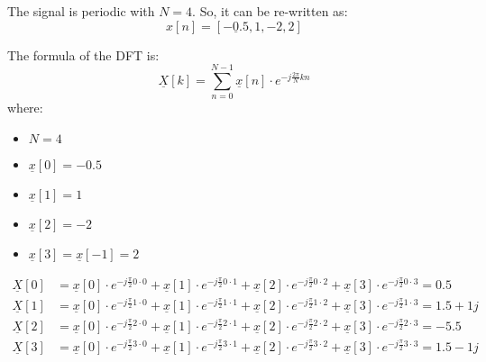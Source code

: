 \begin{solution}
	The signal is periodic with $N = 4$. So, it can be re-written as:
	\begin{equation*}
		x[n] = \left[\underline{-0.5}, 1, -2, 2\right]
	\end{equation*}
	
	\begin{tasks}
		\task
		The formula of the DFT is:
		\begin{equation}
			\underline{X}[k] = \sum\limits_{n = 0}^{N - 1} \underline{x}[n] \cdot e^{- j \frac{2 \pi}{N} k n}
		\end{equation}
		where:
		\begin{itemize}
			\item $N = 4$
			\item $\underline{x}[0] = -0.5$
			\item $\underline{x}[1] = 1$
			\item $\underline{x}[2] = -2$
			\item $\underline{x}[3] = \underline{x}[-1] = 2$
		\end{itemize}
		
		\begin{equation*}
			\begin{split}
				\underline{X}[0] &= \underline{x}[0] \cdot e^{-j \frac{\pi}{2} 0 \cdot 0} + \underline{x}[1] \cdot e^{-j \frac{\pi}{2} 0 \cdot 1} + \underline{x}[2] \cdot e^{-j \frac{\pi}{2} 0 \cdot 2} + \underline{x}[3] \cdot e^{-j \frac{\pi}{2} 0 \cdot 3} = 0.5 \\
				\underline{X}[1] &= \underline{x}[0] \cdot e^{-j \frac{\pi}{2} 1 \cdot 0} + \underline{x}[1] \cdot e^{-j \frac{\pi}{2} 1 \cdot 1} + \underline{x}[2] \cdot e^{-j \frac{\pi}{2} 1 \cdot 2} + \underline{x}[3] \cdot e^{-j \frac{\pi}{2} 1 \cdot 3} = 1.5+1j \\
				\underline{X}[2] &= \underline{x}[0] \cdot e^{-j \frac{\pi}{2} 2 \cdot 0} + \underline{x}[1] \cdot e^{-j \frac{\pi}{2} 2 \cdot 1} + \underline{x}[2] \cdot e^{-j \frac{\pi}{2} 2 \cdot 2} + \underline{x}[3] \cdot e^{-j \frac{\pi}{2} 2 \cdot 3} = -5.5 \\
				\underline{X}[3] &= \underline{x}[0] \cdot e^{-j \frac{\pi}{2} 3 \cdot 0} + \underline{x}[1] \cdot e^{-j \frac{\pi}{2} 3 \cdot 1} + \underline{x}[2] \cdot e^{-j \frac{\pi}{2} 3 \cdot 2} + \underline{x}[3] \cdot e^{-j \frac{\pi}{2} 3 \cdot 3} = 1.5-1j
			\end{split}
		\end{equation*}
		
		\task
		\begin{figure}[H]
			\centering
			\begin{circuitikz}[
				x=0.4cm,
				y=0.4cm,
				littleamp/.style={amp, blocks/scale=0.2}
			]
				

\end{circuitikz}
\end{figure}
\end{tasks}
\end{solution}
